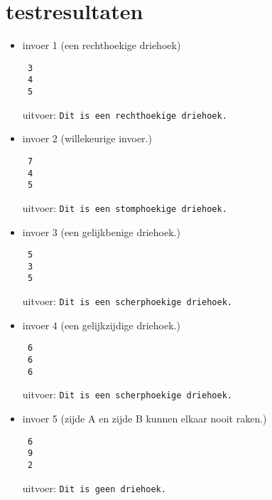 \documentclass[a4paper,10pt]{article}
\title{}
\author{}
\begin{document}
\maketitle


\section{testresultaten}
\begin{itemize}
 \item invoer 1 (een rechthoekige driehoek)
\begin{lstlisting}
 3
 4
 5
\end{lstlisting}
uitvoer: {\tt Dit is een rechthoekige driehoek.}
\\
\item invoer 2 (willekeurige invoer.)
\begin{lstlisting}
 7
 4
 5
\end{lstlisting}
uitvoer: {\tt Dit is een stomphoekige driehoek.}
\\
\item invoer 3 (een gelijkbenige driehoek.)
\begin{lstlisting}
 5
 3
 5
\end{lstlisting}
uitvoer: {\tt Dit is een scherphoekige driehoek.}
\\
\item invoer 4 (een gelijkzijdige driehoek.)
\begin{lstlisting}
 6
 6
 6
\end{lstlisting}
uitvoer: {\tt Dit is een scherphoekige driehoek.}
\\
\item invoer 5 (zijde A en zijde B kunnen elkaar nooit raken.)
\begin{lstlisting}
 6
 9
 2
\end{lstlisting}
uitvoer: {\tt Dit is geen driehoek.}

\end{itemize}
\end{document}
